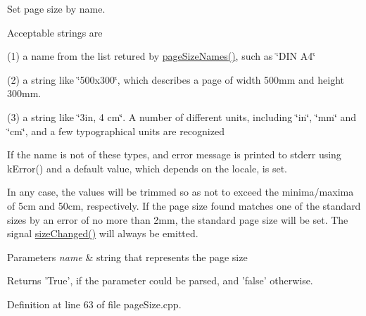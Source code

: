 Set page size by name. 

Acceptable strings are

(1) a name from the list retured by \hyperlink{classpageSize_a074be4f8071c9acf4b54b4cd463f4d7b}{page\+Size\+Names()}, such as \char`\"{}\+D\+I\+N
    A4\char`\"{}

(2) a string like \char`\"{}500x300\char`\"{}, which describes a page of width 500mm and height 300mm.

(3) a string like \char`\"{}3in, 4 cm\char`\"{}. A number of different units, including \char`\"{}in\char`\"{}, \char`\"{}mm\char`\"{} and \char`\"{}cm\char`\"{}, and a few typographical units are recognized

If the name is not of these types, and error message is printed to stderr using k\+Error() and a default value, which depends on the locale, is set.

In any case, the values will be trimmed so as not to exceed the minima/maxima of 5cm and 50cm, respectively. If the page size found matches one of the standard sizes by an error of no more than 2mm, the standard page size will be set. The signal \hyperlink{classpageSize_ae49ee59892403f920d614d0c8d9daa5b}{size\+Changed()} will always be emitted.


\begin{DoxyParams}{Parameters}
{\em name} & string that represents the page size\\
\hline
\end{DoxyParams}
\begin{DoxyReturn}{Returns}
'True', if the parameter could be parsed, and 'false' otherwise. 
\end{DoxyReturn}


Definition at line 63 of file page\+Size.\+cpp.


